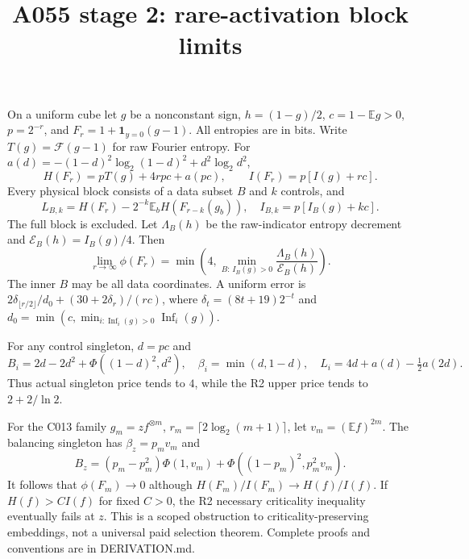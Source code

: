 \documentclass{article}
\begin{document}
\title{A055 stage 2: rare-activation block limits}\maketitle
On a uniform cube let $g$ be a nonconstant sign, $h=(1-g)/2$,
$c=1-\mathbb Eg>0$, $p=2^{-r}$, and $F_r=1+\mathbf1_{y=0}(g-1)$.
All entropies are in bits. Write $T(g)=\mathcal F(g-1)$ for raw Fourier
entropy. For $a(d)=-(1-d)^2\log_2(1-d)^2+d^2\log_2d^2$,
\[
 H(F_r)=pT(g)+4rpc+a(pc),\qquad I(F_r)=p[I(g)+rc].
\]
Every physical block consists of a data subset $B$ and $k$ controls, and
\[
 L_{B,k}=H(F_r)-2^{-k}\mathbb E_bH(F_{r-k}(g_b)),\quad
 I_{B,k}=p[I_B(g)+kc].
\]
The full block is excluded. Let $\Lambda_B(h)$ be the raw-indicator
entropy decrement and $\mathcal E_B(h)=I_B(g)/4$. Then
\[
 \lim_{r\to\infty}\phi(F_r)=
 \min\left(4,\min_{B:\,I_B(g)>0}
 \frac{\Lambda_B(h)}{\mathcal E_B(h)}\right).
\]
The inner $B$ may be all data coordinates. A uniform error is
$2\delta_{\lfloor r/2\rfloor}/d_0+(30+2\delta_r)/(rc)$,
where $\delta_t=(8t+19)2^{-t}$ and
$d_0=\min(c,\min_{i:\operatorname{Inf}_i(g)>0}\operatorname{Inf}_i(g))$.

For any control singleton, $d=pc$ and
\[
 B_i=2d-2d^2+\Phi((1-d)^2,d^2),\quad
 \beta_i=\min(d,1-d),\quad
 L_i=4d+a(d)-\tfrac12a(2d).
\]
Thus actual singleton price tends to $4$, while the R2 upper price tends
to $2+2/\ln2$.

For the C013 family $g_m=z f^{\otimes m}$,
$r_m=\lceil2\log_2(m+1)\rceil$, let $v_m=(\mathbb Ef)^{2m}$.
The balancing singleton has $\beta_z=p_mv_m$ and
\[
 B_z=(p_m-p_m^2)\Phi(1,v_m)+\Phi((1-p_m)^2,p_m^2v_m).
\]
It follows that $\phi(F_m)\to0$ although
$H(F_m)/I(F_m)\to H(f)/I(f)$. If $H(f)>CI(f)$ for fixed $C>0$,
the R2 necessary criticality inequality eventually fails at $z$.
This is a scoped obstruction to criticality-preserving embeddings,
not a universal paid selection theorem. Complete proofs and conventions
are in DERIVATION.md.
\end{document}
